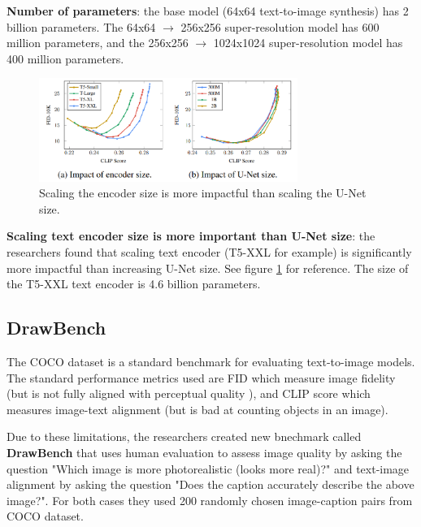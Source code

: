 \textbf{Number of parameters}: the base model (64x64 text-to-image synthesis) has 2 billion parameters. The 64x64 $\rightarrow$ 256x256 super-resolution model has 600 million parameters, and the 256x256 $\rightarrow$ 1024x1024 super-resolution model has 400 million parameters.

\begin{figure}
    \centering
    \includegraphics[width=0.75\textwidth]{images/imagen/encoder_vs_unet_size_impact.png}
    \caption{Scaling the encoder size is more impactful than scaling the U-Net size.}
    \label{fig:imagen_scaling_encoder_more_impactful_than_unet_scaling}
\end{figure}

\textbf{Scaling text encoder size is more important than U-Net size}: the researchers found that scaling text encoder (T5-XXL for example) is significantly more impactful than increasing U-Net size. See figure \ref{fig:imagen_scaling_encoder_more_impactful_than_unet_scaling} for reference. The size of the T5-XXL text encoder is 4.6 billion parameters.
















\subsection{DrawBench}

The COCO dataset \cite{coco_dataset} is a standard benchmark for evaluating text-to-image models. The standard performance metrics used are FID \cite{fid_score} which measure image fidelity (but is not fully aligned with perceptual quality \cite{perceptual_quality}), and CLIP score \cite{openai_clip} which measures image-text alignment (but is bad at counting objects in an image).

Due to these limitations, the researchers created new bnechmark called \textbf{DrawBench} that uses human evaluation to assess image quality by asking the question "Which image is more photorealistic (looks more real)?" and text-image alignment by asking the question "Does the caption accurately describe the above image?". For both cases they used 200 randomly chosen image-caption pairs from COCO dataset.

